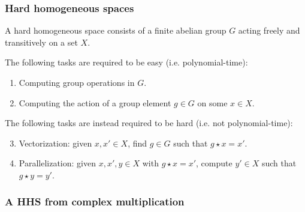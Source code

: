 \documentclass{beamer}
\begin{document}
    \begin{frame}
        \frametitle{Hard homogeneous spaces}
        
        \begin{definition}
            A hard homogeneous space consists of a finite abelian group $G$ acting freely and transitively on a set $X$.
            
            The following tasks are required to be easy (i.e. polynomial-time):
            \begin{enumerate}
                \item Computing group operations in $G$.
                \item Computing the action of a group element $g\in G$ on some $x\in X$.
            \end{enumerate}
            
            The following tasks are instead required to be hard (i.e. not polynomial-time):
            \begin{enumerate}
                \setcounter{enumi}{2}
                \item Vectorization: given $x,x'\in X$, find $g\in G$ such that $g\star x=x'$.
                \item Parallelization: given $x,x',y\in X$ with $g\star x=x'$, compute $y'\in X$ such that $g\star y=y'$.
            \end{enumerate}
        \end{definition}
        
    \end{frame}


    \begin{frame}
        \frametitle{A HHS from complex multiplication}
    
    \end{frame}
\end{document}
